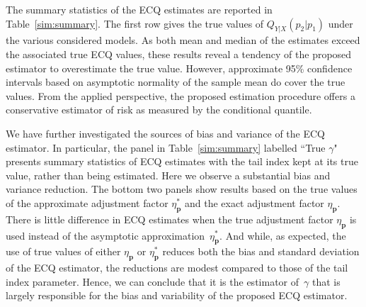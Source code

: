 \documentclass[11pt,letterpaper]{article}
\def\g{\gamma}
\def\h{\eta}
\def\pb{{\mathbf p}}
\numberwithin{equation}{section}
\begin{document}
The summary statistics of the ECQ estimates are reported in Table~\ref{sim:summary}. The first row gives the true values of $Q_{Y|X}(p_2|p_1)$ under the various considered models.
As both mean and median of the estimates exceed the associated true ECQ values, these results reveal a tendency of the proposed estimator to overestimate the true value. However, approximate 95\% confidence intervals based on asymptotic normality of the sample mean do cover the true values. From the applied perspective, the proposed estimation procedure offers a conservative estimator of risk as measured by the conditional quantile.

We have further investigated the sources of bias and variance of the ECQ estimator. In particular, the panel in Table~\ref{sim:summary} labelled ``True $\g$" presents summary statistics of ECQ estimates with the tail index kept at its true value, rather than being estimated. Here we observe a substantial bias and variance reduction. The bottom two panels show results based on the true values of the approximate adjustment factor $\h_\pb^*$ and the exact adjustment factor $\h_\pb$. There is little difference in ECQ estimates when the true adjustment factor $\h_\pb$ is used instead of the asymptotic approximation~$\h_\pb^*$. And while, as expected, the use of true values of either $\h_\pb$ or $\h_\pb^*$ reduces both the bias and standard deviation of the ECQ estimator, the reductions are modest compared to those of the tail index parameter. Hence, we can conclude that it is the estimator of~$\g$ that is largely responsible for the bias and variability of the proposed ECQ estimator.
\end{document}

